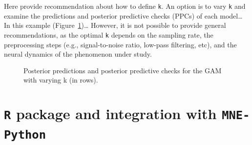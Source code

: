 \documentclass[
  doc,
  floatsintext,
  longtable,
  a4paper,
  nolmodern,
  notxfonts,
  notimes,
  donotrepeattitle,
  colorlinks=true,linkcolor=blue,citecolor=blue,urlcolor=blue]{apa7}
\begin{document}
Here provide recommendation about how to define \texttt{k}. An option is
to vary \texttt{k} and examine the predictions and posterior predictive
checks (PPCs) of each model\ldots{} In this example
(Figure~\ref{fig-choose-k})\ldots{} However, it is not possible to
provide general recommendations, as the optimal \texttt{k} depends on
the sampling rate, the preprocessing steps (e.g., signal-to-noise ratio,
low-pass filtering, etc), and the neural dynamics of the phenomenon
under study.

\begin{figure}[!htb]

\caption{\label{fig-choose-k}Posterior predictions and posterior
predictive checks for the GAM with varying k (in rows).}


\end{figure}%

\newpage

\section{\texorpdfstring{\texttt{R} package and integration with
\texttt{MNE-Python}}{R package and integration with MNE-Python}}\label{r-package-and-integration-with-mne-python}
\end{document}
